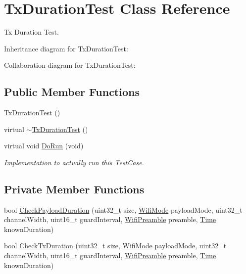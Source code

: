 \hypertarget{classTxDurationTest}{}\section{Tx\+Duration\+Test Class Reference}
\label{classTxDurationTest}


Tx Duration Test.  




Inheritance diagram for Tx\+Duration\+Test\+:


Collaboration diagram for Tx\+Duration\+Test\+:
\subsection*{Public Member Functions}
\begin{DoxyCompactItemize}
\item 
\hyperlink{classTxDurationTest_a49bcdc97faa9d9679bde91c929304f1d}{Tx\+Duration\+Test} ()
\item 
virtual \hyperlink{classTxDurationTest_a9a8228f5ee6350234b351df390be289a}{$\sim$\+Tx\+Duration\+Test} ()
\item 
virtual void \hyperlink{classTxDurationTest_a92181289166e9577bebdbdb352169597}{Do\+Run} (void)
\begin{DoxyCompactList}\small\item\em Implementation to actually run this Test\+Case. \end{DoxyCompactList}\end{DoxyCompactItemize}
\subsection*{Private Member Functions}
\begin{DoxyCompactItemize}
\item 
bool \hyperlink{classTxDurationTest_a3b56291189e8cfa83d41503d7fbd6d6c}{Check\+Payload\+Duration} (uint32\+\_\+t size, \hyperlink{classns3_1_1WifiMode}{Wifi\+Mode} payload\+Mode, uint32\+\_\+t channel\+Width, uint16\+\_\+t guard\+Interval, \hyperlink{group__wifi_ga5e94a56cb338a14ffbbb19c6a41251eb}{Wifi\+Preamble} preamble, \hyperlink{classns3_1_1Time}{Time} known\+Duration)
\item 
bool \hyperlink{classTxDurationTest_ac86b852957ecf1a1bed4f4e48debb30e}{Check\+Tx\+Duration} (uint32\+\_\+t size, \hyperlink{classns3_1_1WifiMode}{Wifi\+Mode} payload\+Mode, uint32\+\_\+t channel\+Width, uint16\+\_\+t guard\+Interval, \hyperlink{group__wifi_ga5e94a56cb338a14ffbbb19c6a41251eb}{Wifi\+Preamble} preamble, \hyperlink{classns3_1_1Time}{Time} known\+Duration)
\end{DoxyCompactItemize}
